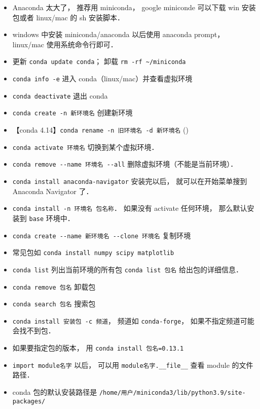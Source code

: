 
\begin{itemize}
\item Anaconda 太大了， 推荐用 miniconda， google miniconde 可以下载 win 安装包或者 linux/mac 的 sh 安装脚本．
\item windows 中安装 miniconda/anaconda 以后使用 anaconda prompt， linux/mac 使用系统命令行即可．
\item 更新 \verb|conda update conda|； 卸载 \verb|rm -rf ~/miniconda|
\item \verb|conda info -e| 进入 conda（linux/mac）并查看虚拟环境
\item \verb|conda deactivate| 退出 conda
\item \verb|conda create -n 新环境名| 创建新环境
\item 【conda 4.14】\verb|conda rename -n 旧环境名 -d 新环境名| ()
\item \verb|conda activate 环境名| 切换到某个虚拟环境．
\item \verb|conda remove --name 环境名 --all| 删除虚拟环境（不能是当前环境）．
\item \verb|conda install anaconda-navigator| 安装完以后， 就可以在开始菜单搜到 Anaconda Navigator 了．
\item \verb|conda install -n 环境名 包名称|． 如果没有 activate 任何环境， 那么默认安装到 \verb|base| 环境中．
\item \verb|conda create --name 新环境名 --clone 环境名| 复制环境
\item 常见包如 \verb|conda install numpy scipy matplotlib|
\item \verb|conda list| 列出当前环境的所有包 \verb|conda list 包名| 给出包的详细信息．
\item \verb|conda remove 包名| 卸载包
\item \verb|conda search 包名| 搜索包
\item \verb|conda install 安装包 -c 频道|， 频道如 \verb|conda-forge|， 如果不指定频道可能会找不到包．
\item 如果要指定包的版本， 用 \verb|conda install 包名=0.13.1|
\item \verb|import module名字| 以后， 可以用 \verb|module名字.__file__| 查看 module 的文件路径．
\item conda 包的默认安装路径是 \verb|/home/用户/miniconda3/lib/python3.9/site-packages/|
\end{itemize}
